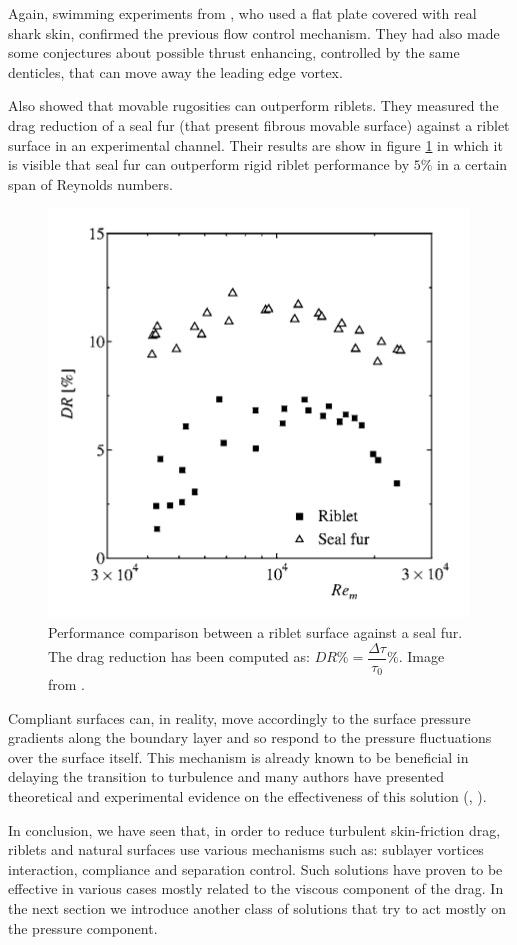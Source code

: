 Again, swimming experiments from \citet{Oeffner785}, who used a flat plate covered with real shark skin, confirmed the previous flow control mechanism. They had also made some conjectures about possible thrust enhancing, controlled by the same denticles, that can move away the leading edge vortex.

Also \citet{itoh2006turbulent} showed that movable rugosities can outperform riblets. They measured the drag reduction of a seal fur (that present fibrous movable surface) against a riblet surface in an experimental channel. Their results are show in figure \ref{fig:seal} in which it is visible that seal fur can outperform  rigid riblet performance by $5\%$ in a certain span of Reynolds numbers.

\begin{figure}[h]
\centering
\includegraphics[width=0.5\linewidth]{chapter_1/seal}
\caption{Performance comparison between a riblet surface against a seal fur. The drag reduction has been computed as: $DR \% = \dfrac{ \Delta \tau}{\tau_{0}} \%$. Image from \citet{itoh2006turbulent}.}
\label{fig:seal}
\end{figure}


Compliant surfaces can, in reality, move accordingly to the surface pressure gradients along the boundary layer and so respond to the pressure fluctuations over the surface itself.
This mechanism is already known to be beneficial in delaying the transition to turbulence and many authors have presented theoretical and experimental evidence on the effectiveness of this solution (\citet{carpenter1990status}, \citet{bushnell1977effect}).

In conclusion, we have seen that, in order to reduce turbulent skin-friction drag, riblets and natural surfaces use various mechanisms such as: sublayer vortices interaction, compliance and separation control. Such solutions have proven to be effective in various cases mostly related to the viscous component of the drag.
In the next section we introduce another class of solutions that try to act mostly on the pressure component.


